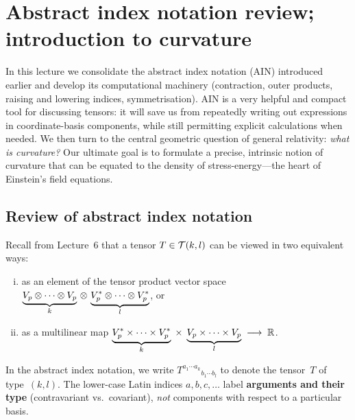 
\section{Abstract index notation review; introduction to curvature}%
\label{sec:ain-curvature}

In this lecture we consolidate the abstract index notation (AIN)
introduced earlier and develop its computational machinery
(contraction, outer products, raising and lowering indices,
symmetrisation).  AIN is a very helpful and compact tool for
discussing tensors: it will save us from repeatedly writing out
expressions in coordinate-basis components, while still
permitting explicit calculations when needed.  We then turn to
the central geometric question of general relativity: \emph{what
is curvature?}  Our ultimate goal is to formulate a precise,
intrinsic notion of curvature that can be equated to the density
of stress-energy---the heart of Einstein's field equations.

\subsection{Review of abstract index notation}\label{sec:ain-review}

Recall from Lecture~6 that a tensor $T\in\mathcal{T}(k,l)$ can be
viewed in two equivalent ways:
\begin{enumerate}[(i)]
  \item as an element of the tensor product vector space
    $\underbrace{V_p\otimes\cdots\otimes V_p}_{k}\,\otimes\,
     \underbrace{V_p^*\otimes\cdots\otimes V_p^*}_{l}$, or
  \item as a multilinear map
    $\underbrace{V_p^*\times\cdots\times V_p^*}_{k}
     \;\times\;
     \underbrace{V_p\times\cdots\times V_p}_{l}
     \;\longrightarrow\; \mathbb{R}$.
\end{enumerate}

\begin{notation}
  In the abstract index notation, we write
  $T^{a_1\cdots a_k}{}_{b_1\cdots b_l}$
  to denote the tensor~$T$ of type~$(k,l)$.  The lower-case
  Latin indices $a,b,c,\dots$ label \textbf{arguments and their
  type} (contravariant vs.\ covariant), \emph{not} components
  with respect to a particular basis.
\end{notation}

